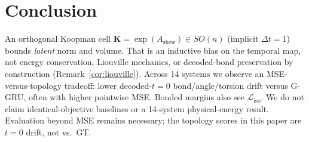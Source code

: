 \documentclass{article}
\newcommand{\K}{\mathbf{K}}
\newcommand{\Ask}{A_{\mathrm{skew}}}
\newcommand{\GGRU}{\textsc{G-GRU}}
\begin{document}
\section{Conclusion}
\label{sec:conclusion}

An orthogonal Koopman cell $\K=\exp(\Ask)\in SO(n)$ (implicit $\Delta t=1$) bounds \emph{latent} norm and volume. That is an inductive bias on the temporal map, not energy conservation, Liouville mechanics, or decoded-bond preservation by construction (Remark~\ref{cor:liouville}). Across 14 systems we observe an MSE-versus-topology tradeoff: lower decoded-$t=0$ bond/angle/torsion drift versus \GGRU{}, often with higher pointwise MSE. Bonded margins also see $\mathcal{L}_{\text{iso}}$. We do not claim identical-objective baselines or a 14-system physical-energy result. Evaluation beyond MSE remains necessary; the topology scores in this paper are $t=0$ drift, not vs.\ GT.
\end{document}
